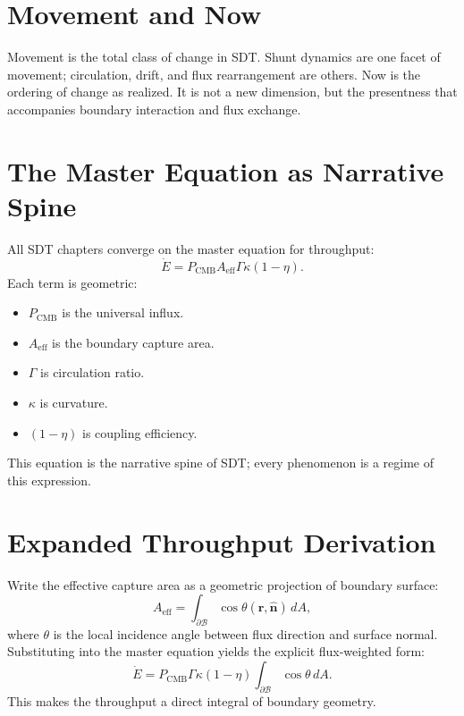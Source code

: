 \documentclass[12pt]{book}
\begin{document}
\section{Movement and Now}
Movement is the total class of change in SDT. Shunt dynamics are one facet of movement; circulation,
drift, and flux rearrangement are others. Now is the ordering of change as realized. It is not a new
dimension, but the presentness that accompanies boundary interaction and flux exchange.

\section{The Master Equation as Narrative Spine}
All SDT chapters converge on the master equation for throughput:
\begin{equation}
\dot{E} = P_{\text{CMB}} A_{\text{eff}} \Gamma \kappa (1-\eta).
\end{equation}
Each term is geometric:
\begin{itemize}
\item $P_{\text{CMB}}$ is the universal influx.
\item $A_{\text{eff}}$ is the boundary capture area.
\item $\Gamma$ is circulation ratio.
\item $\kappa$ is curvature.
\item $(1-\eta)$ is coupling efficiency.
\end{itemize}
This equation is the narrative spine of SDT; every phenomenon is a regime of this expression.

\section{Expanded Throughput Derivation}
Write the effective capture area as a geometric projection of boundary surface:
\begin{equation}
A_{\text{eff}} = \int_{\partial \mathcal{B}} \cos\theta(\mathbf{r},\hat{\mathbf{n}})\, dA,
\end{equation}
where $\theta$ is the local incidence angle between flux direction and surface normal. Substituting into
the master equation yields the explicit flux-weighted form:
\begin{equation}
\dot{E} = P_{\text{CMB}} \Gamma \kappa (1-\eta)\int_{\partial \mathcal{B}} \cos\theta\, dA.
\end{equation}
This makes the throughput a direct integral of boundary geometry.
\end{document}
